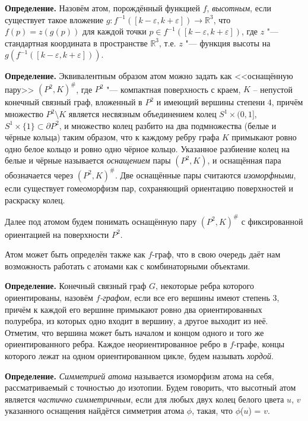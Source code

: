 \textbf{Определение. }
	Назовём атом, порождённый функцией $f$, {\em высотным}, если существует такое вложение $g
	\colon f^{-1}([k-\varepsilon, k+\varepsilon ]) \to \mathbb{R}^3$, что $f(p) = z(g(p))$ для каждой точки $p \in f^{-1}([k-\varepsilon, k+\varepsilon ])$, где $z$
	"--- стандартная координата в пространстве $\mathbb R^3$, т.е. $z$ "--- функция высоты на $g(f^{-1}([k-\varepsilon, k+\varepsilon ]))$.




\textbf{Определение.} Эквивалентным образом атом можно задать как <<оснащённую пару>> $(P^2, K)^\#$, где $P^2$ "--- компактная   поверхность с краем, $K$ -- непустой конечный связный граф, вложенный в $P^2$ и имеющий вершины  степени $4$, причём множество $P^2 \setminus K$ является несвязным объединением колец $S^1 \times (0, 1]$, $ S^1 \times \{1\} \subset\partial P^2$, и множество колец разбито на два подмножества (белые и чёрные кольца) таким образом, что  к каждому ребру графа $K$ примыкают ровно одно белое кольцо и ровно одно чёрное кольцо. Указанное разбиение колец на белые и чёрные называется {\em  оснащением} пары $(P^2, K)$, и оснащённая пара обозначается через $(P^2, K)^\#$. Две оснащённые пары считаются {\em изоморфными}, если существует гомеоморфизм пар, сохраняющий ориентацию поверхностей и раскраску колец.


Далее под атомом будем понимать оснащённую пару $(P^2, K)^\#$ с фиксированной ориентацией на поверхности $P^2$.



Атом может быть определён также как $f$-граф, что в свою очередь даёт нам возможность работать с атомами как с комбинаторными объектами.



\textbf{Определение.} %
Конечный связный граф $G$, некоторые ребра которого ориентированы, назовём {\em
$f$-графом}, если все его вершины имеют степень $3$, причём к каждой его
вершине примыкают ровно два ориентированных полуребра, из которых одно входит в вершину,
а другое выходит из неё. Отметим, что вершина может быть началом и концом одного и того
же ориентированного ребра. Каждое неориентированное ребро в $f$-графе, концы которого лежат на одном ориентированном цикле, будем называть { \em хордой}.



{\bf Определение.}
	{\em Симметрией атома} называется изоморфизм атома на себя, рассматриваемый с точностью до изотопии. Будем говорить, что высотный атом является {\em частично симметричным}, если для любых двух колец белого цвета $u$, $v$ указанного оснащения найдётся симметрия атома $\phi $, такая, что $\phi$($u$) = $v$.



